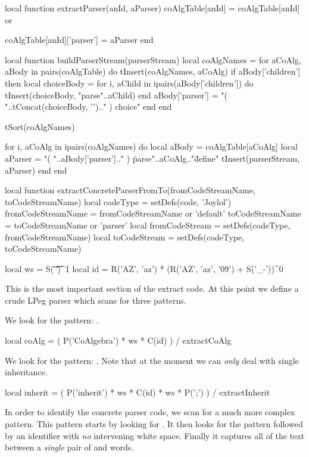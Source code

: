 local function extractParser(anId, aParser)
  coAlgTable[anId] = coAlgTable[anId] or {}
  
  coAlgTable[anId]['parser'] = aParser
end

local function buildParserStream(parserStream)
  local coAlgNames = { }
  for aCoAlg, aBody in pairs(coAlgTable) do
    tInsert(coAlgNames, aCoAlg)
    if aBody['children'] then
      local choiceBody = {}
      for i, aChild in ipairs(aBody['children']) do
        tInsert(choiceBody, "parse"..aChild)
      end
      aBody['parser'] = "( "..tConcat(choiceBody, '\n').." ) choice"
    end
  end
  
  tSort(coAlgNames)
  
  for i, aCoAlg in ipairs(coAlgNames) do
    local aBody   = coAlgTable[aCoAlg]
    local aParser = "( "..aBody['parser'].." ) \"parse"..aCoAlg.."\" define"
    tInsert(parserStream, aParser)
  end
end

local function extractConcreteParserFromTo(fromCodeStreamName, toCodeStreamName)
  local codeType       = setDefs(code, 'Joylol')
  fromCodeStreamName   = fromCodeStreamName or 'default'
  toCodeStreamName     = toCodeStreamName   or 'parser'
  local fromCodeStream = setDefs(codeType, fromCodeStreamName)
  local toCodeStream   = setDefs(codeType, toCodeStreamName)

  local ws       = S('\r\n\f\t ')^1
  local id       = R('AZ', 'az') * (R('AZ', 'az', '09') + S('_-'))^0
\stopLuaCode

This is the most important section of the extract code. At this point we 
define a crude LPeg parser which scans for three patterns.

\startitemize[n]

\item {} We look for the pattern: . 

\startLuaCode
  local coAlg =
    ( P('CoAlgebra') * ws * C(id) ) / extractCoAlg
\stopLuaCode

\item {} We look for the pattern: . 
Note that at the moment we can \emph{only} deal with single inheritance. 

\startLuaCode
  local inherit  =
    ( P('inherit') * ws * C(id) * ws * P(';') ) / extractInherit
\stopLuaCode

\item {} In order to identify the concrete parser 
code, we scan for a much more complex pattern. This pattern starts by 
looking for . It then looks for the 
pattern  followed by an identifier with \emph{no} intervening 
white space. Finally it captures all of the text between a \emph{single} 
pair of  and  words. 

